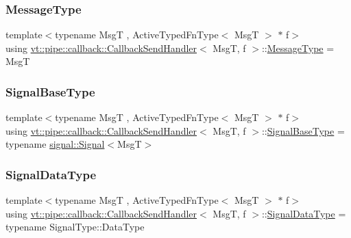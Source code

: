 \subsubsection{\texorpdfstring{Message\+Type}{MessageType}}
{\footnotesize\ttfamily template$<$typename MsgT , Active\+Typed\+Fn\+Type$<$ Msg\+T $>$ $\ast$ f$>$ \\
using \hyperlink{structvt_1_1pipe_1_1callback_1_1_callback_send_handler}{vt\+::pipe\+::callback\+::\+Callback\+Send\+Handler}$<$ MsgT, f $>$\+::\hyperlink{structvt_1_1pipe_1_1callback_1_1_callback_send_handler_a36b875a40dee2312857aacd407d5f9d3}{Message\+Type} =  MsgT}

\mbox{\label{structvt_1_1pipe_1_1callback_1_1_callback_send_handler_af46916844a27c29e7c6134f962d0964f}} 
\subsubsection{\texorpdfstring{Signal\+Base\+Type}{SignalBaseType}}
{\footnotesize\ttfamily template$<$typename MsgT , Active\+Typed\+Fn\+Type$<$ Msg\+T $>$ $\ast$ f$>$ \\
using \hyperlink{structvt_1_1pipe_1_1callback_1_1_callback_send_handler}{vt\+::pipe\+::callback\+::\+Callback\+Send\+Handler}$<$ MsgT, f $>$\+::\hyperlink{structvt_1_1pipe_1_1callback_1_1_callback_send_handler_af46916844a27c29e7c6134f962d0964f}{Signal\+Base\+Type} =  typename \hyperlink{structvt_1_1pipe_1_1signal_1_1_signal}{signal\+::\+Signal}$<$MsgT$>$}

\mbox{\label{structvt_1_1pipe_1_1callback_1_1_callback_send_handler_abe4218870eea9f91ac7bbffbc58b92fd}} 
\subsubsection{\texorpdfstring{Signal\+Data\+Type}{SignalDataType}}
{\footnotesize\ttfamily template$<$typename MsgT , Active\+Typed\+Fn\+Type$<$ Msg\+T $>$ $\ast$ f$>$ \\
using \hyperlink{structvt_1_1pipe_1_1callback_1_1_callback_send_handler}{vt\+::pipe\+::callback\+::\+Callback\+Send\+Handler}$<$ MsgT, f $>$\+::\hyperlink{structvt_1_1pipe_1_1callback_1_1_callback_send_handler_abe4218870eea9f91ac7bbffbc58b92fd}{Signal\+Data\+Type} =  typename Signal\+Type\+::\+Data\+Type}

